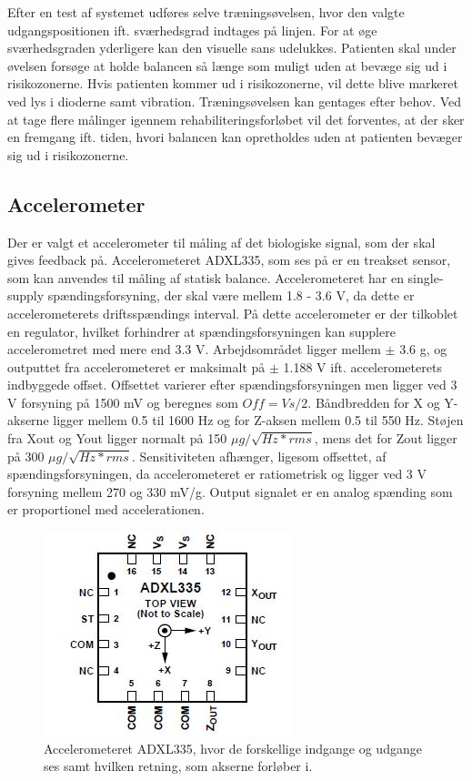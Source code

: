 Efter en test af systemet udføres selve træningsøvelsen, hvor den valgte udgangspositionen ift. sværhedsgrad indtages på linjen. For at øge sværhedsgraden yderligere kan den visuelle sans udelukkes. Patienten skal under øvelsen forsøge at holde balancen så længe som muligt uden at bevæge sig ud i risikozonerne. Hvis patienten kommer ud i risikozonerne, vil dette blive markeret ved lys i dioderne samt vibration. Træningsøvelsen kan gentages efter behov. Ved at tage flere målinger igennem rehabiliteringsforløbet vil det forventes, at der sker en fremgang ift. tiden, hvori balancen kan opretholdes uden at patienten bevæger sig ud i risikozonerne. 

\subsection{Accelerometer}
Der er valgt et accelerometer til måling af det biologiske signal, som der skal gives feedback på. Accelerometeret ADXL335, som ses på  er en treakset sensor, som kan anvendes til måling af statisk balance. Accelerometeret har en single-supply spændingsforsyning, der skal være mellem 1.8 - 3.6 V, da dette er accelerometerets driftsspændings interval. På dette accelerometer er der tilkoblet en regulator, hvilket forhindrer at spændingsforsyningen kan supplere accelerometret med mere end 3.3 V.  Arbejdsområdet ligger mellem $\pm$ 3.6 g, og outputtet fra accelerometeret er maksimalt på $\pm$ 1.188 V ift. accelerometerets indbyggede offset. Offsettet varierer efter spændingsforsyningen men ligger ved 3 V forsyning på 1500 mV og beregnes som $Off = Vs/2$. Båndbredden for X og Y-akserne ligger mellem 0.5 til 1600 Hz og for Z-aksen mellem 0.5 til 550 Hz. Støjen fra Xout og Yout ligger normalt på 150 $\mu g/\sqrt{Hz * rms}$, mens det for Zout ligger på 300 $\mu g/\sqrt{Hz * rms}$. Sensitiviteten afhænger, ligesom offsettet, af spændingsforsyningen, da accelerometeret er ratiometrisk og ligger ved 3 V forsyning mellem 270 og 330 mV/g. Output signalet er en analog spænding som er proportionel med accelerationen. \cite{Devices2009} %

\begin{figure}[H]
	\centering 
	\includegraphics[scale=0.9]{figures/cProblemloesning/ADXL335.JPG}
	\caption{Accelerometeret ADXL335, hvor de forskellige indgange og udgange ses samt hvilken retning, som akserne forløber i. \cite{Devices2009}}
	\label{ADXL335}
\end{figure}

